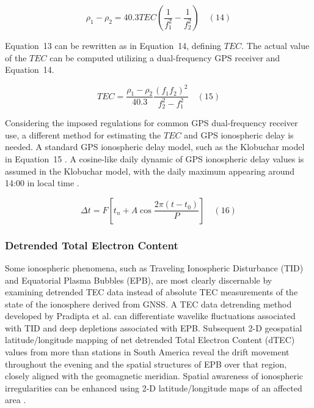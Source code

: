\documentclass[sn-mathphys-num]{sn-jnl}%
\begin{document}
\begin{equation}
	\rho_{1} - \rho_{2} = 40.3 TEC \left( \frac{1}{f_{1}^{2}} - \frac{1}{f_{2}^{2}} \right)
	\quad\left(14\right)
\end{equation}

Equation~13 can be rewritten as in Equation~14, defining $TEC$. The actual value of the $TEC$ can be computed utilizing a dual-frequency GPS receiver and Equation~14.

\begin{equation}
	TEC = \frac{\rho_{1} - \rho_{2}}{40.3} \frac{{\left(f_{1}f_{2}\right)}^{2}}{f_{2}^{2}-f_{1}^{2}}
	\quad\left(15\right)
\end{equation}

Considering the imposed regulations for common GPS dual-frequency receiver use, a different method for estimating the $TEC$ and GPS ionospheric delay is needed. A standard GPS ionospheric delay model, such as the Klobuchar model in Equation~15 \cite{enge1994global,spilker1996global}. A cosine-like daily dynamic of GPS ionospheric delay values is assumed in the Klobuchar model, with the daily maximum appearing around 14:00 in local time \cite{klobuchar1987ionospheric}.

\begin{equation}
	\Delta t = F \left[ t_{n} + A \cos \frac{2\pi\left(t-t_{0}\right)}{P} \right]
	\quad\left(16\right)
\end{equation}

\subsubsection{Detrended Total Electron Content}

Some ionospheric phenomena, such as Traveling Ionospheric Disturbance (TID) and Equatorial Plasma Bubbles (EPB), are most clearly discernable by examining detrended TEC data instead of absolute TEC measurements of the state of the ionosphere derived from GNSS. A TEC data detrending method developed by Pradipta et al. \cite{Pradipta2015} can differentiate wavelike fluctuations associated with TID and deep depletions associated with EPB. Subsequent 2-D geospatial latitude/longitude mapping of net detrended Total Electron Content (dTEC) values from more than stations in South America reveal the drift movement throughout the evening and the spatial structures of EPB over that region, closely aligned with the geomagnetic meridian. Spatial awareness of ionospheric irregularities can be enhanced using 2-D latitude/longitude maps of an affected area \cite{Pradipta2019}.
\end{document}
